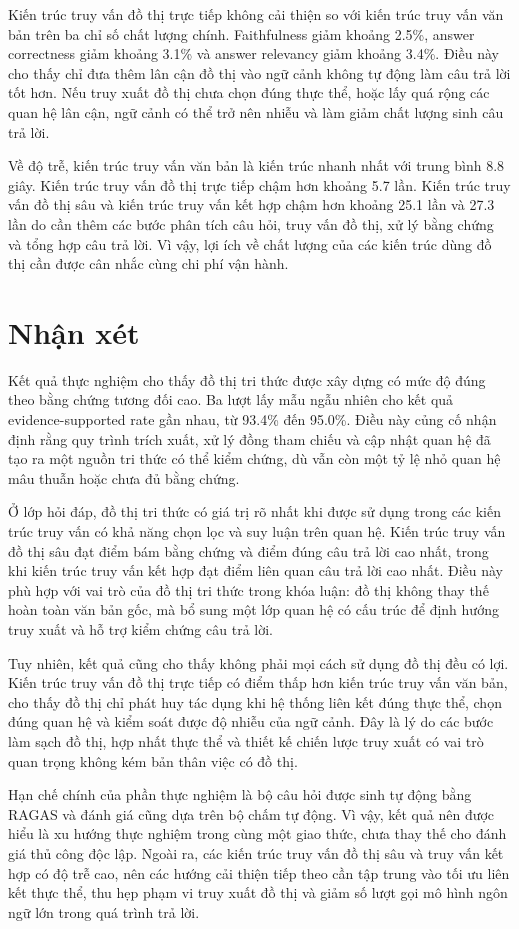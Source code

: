 Kiến trúc truy vấn đồ thị trực tiếp không cải thiện so với kiến trúc truy vấn văn bản trên ba chỉ số chất lượng chính. Faithfulness giảm khoảng 2.5\%, answer correctness giảm khoảng 3.1\% và answer relevancy giảm khoảng 3.4\%. Điều này cho thấy chỉ đưa thêm lân cận đồ thị vào ngữ cảnh không tự động làm câu trả lời tốt hơn. Nếu truy xuất đồ thị chưa chọn đúng thực thể, hoặc lấy quá rộng các quan hệ lân cận, ngữ cảnh có thể trở nên nhiễu và làm giảm chất lượng sinh câu trả lời.

Về độ trễ, kiến trúc truy vấn văn bản là kiến trúc nhanh nhất với trung bình 8.8 giây. Kiến trúc truy vấn đồ thị trực tiếp chậm hơn khoảng 5.7 lần. Kiến trúc truy vấn đồ thị sâu và kiến trúc truy vấn kết hợp chậm hơn khoảng 25.1 lần và 27.3 lần do cần thêm các bước phân tích câu hỏi, truy vấn đồ thị, xử lý bằng chứng và tổng hợp câu trả lời. Vì vậy, lợi ích về chất lượng của các kiến trúc dùng đồ thị cần được cân nhắc cùng chi phí vận hành.

\section{Nhận xét}

Kết quả thực nghiệm cho thấy đồ thị tri thức được xây dựng có mức độ đúng theo bằng chứng tương đối cao. Ba lượt lấy mẫu ngẫu nhiên cho kết quả evidence-supported rate gần nhau, từ 93.4\% đến 95.0\%. Điều này củng cố nhận định rằng quy trình trích xuất, xử lý đồng tham chiếu và cập nhật quan hệ đã tạo ra một nguồn tri thức có thể kiểm chứng, dù vẫn còn một tỷ lệ nhỏ quan hệ mâu thuẫn hoặc chưa đủ bằng chứng.

Ở lớp hỏi đáp, đồ thị tri thức có giá trị rõ nhất khi được sử dụng trong các kiến trúc truy vấn có khả năng chọn lọc và suy luận trên quan hệ. Kiến trúc truy vấn đồ thị sâu đạt điểm bám bằng chứng và điểm đúng câu trả lời cao nhất, trong khi kiến trúc truy vấn kết hợp đạt điểm liên quan câu trả lời cao nhất. Điều này phù hợp với vai trò của đồ thị tri thức trong khóa luận: đồ thị không thay thế hoàn toàn văn bản gốc, mà bổ sung một lớp quan hệ có cấu trúc để định hướng truy xuất và hỗ trợ kiểm chứng câu trả lời.

Tuy nhiên, kết quả cũng cho thấy không phải mọi cách sử dụng đồ thị đều có lợi. Kiến trúc truy vấn đồ thị trực tiếp có điểm thấp hơn kiến trúc truy vấn văn bản, cho thấy đồ thị chỉ phát huy tác dụng khi hệ thống liên kết đúng thực thể, chọn đúng quan hệ và kiểm soát được độ nhiễu của ngữ cảnh. Đây là lý do các bước làm sạch đồ thị, hợp nhất thực thể và thiết kế chiến lược truy xuất có vai trò quan trọng không kém bản thân việc có đồ thị.

Hạn chế chính của phần thực nghiệm là bộ câu hỏi được sinh tự động bằng RAGAS và đánh giá cũng dựa trên bộ chấm tự động. Vì vậy, kết quả nên được hiểu là xu hướng thực nghiệm trong cùng một giao thức, chưa thay thế cho đánh giá thủ công độc lập. Ngoài ra, các kiến trúc truy vấn đồ thị sâu và truy vấn kết hợp có độ trễ cao, nên các hướng cải thiện tiếp theo cần tập trung vào tối ưu liên kết thực thể, thu hẹp phạm vi truy xuất đồ thị và giảm số lượt gọi mô hình ngôn ngữ lớn trong quá trình trả lời.
